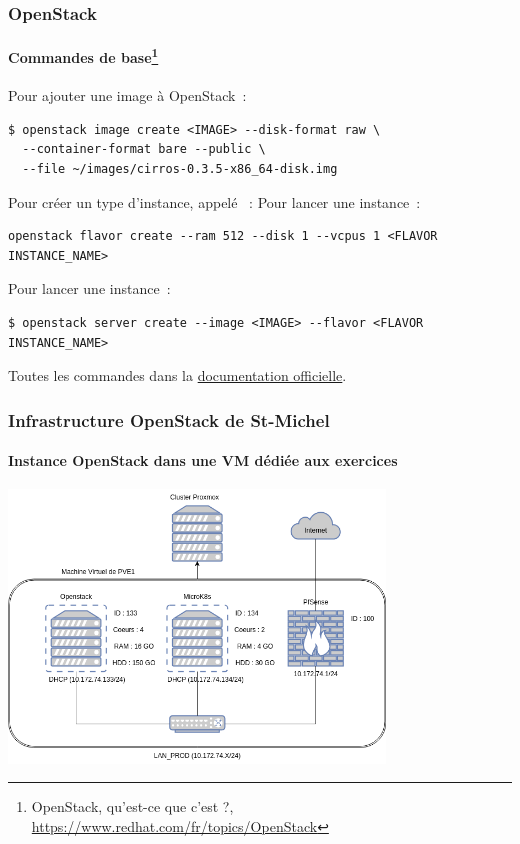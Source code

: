 \documentclass{beamer}
\begin{document}
    \begin{frame}[fragile]
        \transdissolve
        \frametitle{OpenStack}
        \framesubtitle{Commandes de base\footnote{\label{opentackcommand}OpenStack, qu'est-ce que c'est ?, \url{https://www.redhat.com/fr/topics/OpenStack}}}
        Pour ajouter une image à OpenStack~:
        \begin{lstlisting}
$ openstack image create <IMAGE> --disk-format raw \
  --container-format bare --public \
  --file ~/images/cirros-0.3.5-x86_64-disk.img
        \end{lstlisting}
        Pour créer un type d'instance, appelé ~:
        Pour lancer une instance~:
        \begin{lstlisting}
openstack flavor create --ram 512 --disk 1 --vcpus 1 <FLAVOR INSTANCE_NAME>
        \end{lstlisting}
        Pour lancer une instance~:
        \begin{lstlisting}
$ openstack server create --image <IMAGE> --flavor <FLAVOR INSTANCE_NAME>
        \end{lstlisting}
        \bigbreak
        Toutes les commandes dans la \href{https://docs.OpenStack.org/ocata/user-guide/cli-cheat-sheet.html}{documentation officielle}.
    \end{frame}
    \begin{frame}
        \transdissolve
        \frametitle{Infrastructure OpenStack de St-Michel}
        \framesubtitle{Instance OpenStack dans une VM dédiée aux exercices}
        \bigbreak
        \centering
        \includegraphics[width=10cm]{image/infra.drawio}
    \end{frame}
\end{document}
